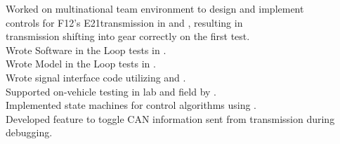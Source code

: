 \runsubsection{\textcolor{JDgreen}{John Deere}}
\runsubsection{\textcolor{JDgreen}{Intelligent Solutions Group}}
\begin{minipage}{1\textwidth\vspace{2pt}}
\textcolor{JDgreen}{\mybar}\faAngleRight Worked on multinational team environment to design and implement\\ 
\textcolor{JDgreen}{\mybar}\textcolor{invisible}{\faAngleRight \space}controls for F12's E21\texttrademark \space transmission in  and , resulting in \\
\textcolor{JDgreen}{\mybar}\textcolor{invisible}{\faAngleRight \space}transmission shifting into gear correctly on the first test. \\
\textcolor{JDgreen}{\mybar}\faAngleRight  Wrote Software in the Loop tests in .\\
\textcolor{JDgreen}{\mybar}\faAngleRight  Wrote Model in the Loop tests in .\\
\textcolor{JDgreen}{\mybar}\faAngleRight  Wrote signal interface code utilizing and .\\
\textcolor{JDgreen}{\mybar}\faAngleRight  Supported on-vehicle testing in lab and field by . \\
\textcolor{JDgreen}{\mybar}\faAngleRight  Implemented state machines for control algorithms using . \\
\textcolor{JDgreen}{\mybar}\faAngleRight  Developed feature to toggle CAN information sent from transmission during\\
\textcolor{JDgreen}{\mybar}\textcolor{invisible}{\faAngleRight}debugging.
\end{minipage}

\sectionsep